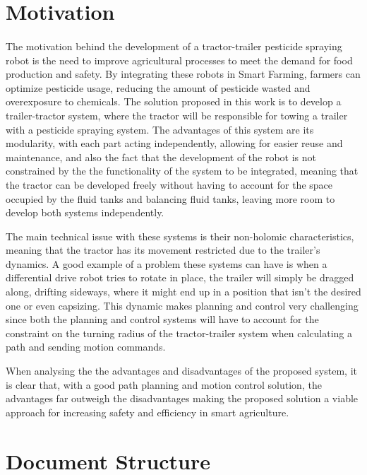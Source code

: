 \section{Motivation}
\label{sec:motivation}
\paragraph{}The motivation behind the development of a tractor-trailer pesticide spraying robot is the need to improve agricultural 
processes to meet the demand for food production and safety. By integrating these robots in Smart Farming, 
farmers can optimize pesticide usage, reducing the amount of pesticide wasted and overexposure to 
chemicals. The solution proposed in this work is to develop a trailer-tractor system, where the tractor will be responsible for 
towing a trailer with a pesticide spraying system. The advantages of this system are its modularity, with each part acting 
independently, allowing for easier reuse and maintenance, and also the fact that the development of the robot is not constrained by the 
the functionality of the system to be integrated, meaning that the tractor can be developed freely without having to account 
for the space occupied by the fluid tanks and balancing fluid tanks, leaving more room to develop both systems independently. 

The main technical issue with these systems is their non-holomic 
characteristics, meaning that the tractor has its movement restricted due to the trailer's dynamics. A 
good example of a problem these systems can have is when a differential drive robot tries to rotate in place, the trailer will 
simply be dragged along, drifting sideways, where it might end up in a position that isn't the desired one or even capsizing. 
This dynamic makes planning and control very challenging since both the planning and control systems will have to account for 
the constraint on the turning radius of the tractor-trailer system when calculating a path and sending motion commands. 

When analysing the the advantages and disadvantages of the proposed system, it is clear that, with a good path planning
and motion control solution, the advantages far outweigh the disadvantages making the proposed solution a viable  
approach for increasing safety and efficiency in smart agriculture.

\section{Document Structure}
\label{sec:documentstruct}
